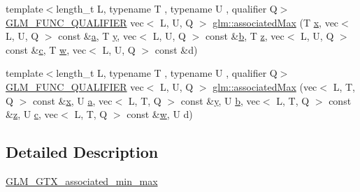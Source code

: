 \begin{DoxyCompactItemize}
\item 
{\footnotesize template$<$length\+\_\+t L, typename T , typename U , qualifier Q$>$ }\\\hyperlink{setup_8hpp_a33fdea6f91c5f834105f7415e2a64407}{G\+L\+M\+\_\+\+F\+U\+N\+C\+\_\+\+Q\+U\+A\+L\+I\+F\+I\+ER} vec$<$ L, U, Q $>$ \hyperlink{group__gtx__associated__min__max_ga11477c2c4b5b0bfd1b72b29df3725a9d}{glm\+::associated\+Max} (T \hyperlink{_s_d_l__opengl_8h_ad0e63d0edcdbd3d79554076bf309fd47}{x}, vec$<$ L, U, Q $>$ const \&\hyperlink{_s_d_l__opengl__glext_8h_a3309789fc188587d666cda5ece79cf82}{a}, T \hyperlink{_s_d_l__opengl_8h_a1675d9d7bb68e1657ff028643b4037e3}{y}, vec$<$ L, U, Q $>$ const \&\hyperlink{_s_d_l__opengl__glext_8h_a0f71581a41fd2264c8944126dabbd010}{b}, T \hyperlink{_s_d_l__opengl__glext_8h_a5e74030ebb3297ce1b37ff716fedd68f}{z}, vec$<$ L, U, Q $>$ const \&\hyperlink{_s_d_l__opengl__glext_8h_a1f2d7f8147412c43ba2303a56f97ee73}{c}, T \hyperlink{_s_d_l__opengl__glext_8h_a6ee8f168a7ab6785a9bb57c6715dad99}{w}, vec$<$ L, U, Q $>$ const \&d)
\item 
{\footnotesize template$<$length\+\_\+t L, typename T , typename U , qualifier Q$>$ }\\\hyperlink{setup_8hpp_a33fdea6f91c5f834105f7415e2a64407}{G\+L\+M\+\_\+\+F\+U\+N\+C\+\_\+\+Q\+U\+A\+L\+I\+F\+I\+ER} vec$<$ L, U, Q $>$ \hyperlink{group__gtx__associated__min__max_gab9c3dd74cac899d2c625b5767ea3b3fb}{glm\+::associated\+Max} (vec$<$ L, T, Q $>$ const \&\hyperlink{_s_d_l__opengl_8h_ad0e63d0edcdbd3d79554076bf309fd47}{x}, U \hyperlink{_s_d_l__opengl__glext_8h_a3309789fc188587d666cda5ece79cf82}{a}, vec$<$ L, T, Q $>$ const \&\hyperlink{_s_d_l__opengl_8h_a1675d9d7bb68e1657ff028643b4037e3}{y}, U \hyperlink{_s_d_l__opengl__glext_8h_a0f71581a41fd2264c8944126dabbd010}{b}, vec$<$ L, T, Q $>$ const \&\hyperlink{_s_d_l__opengl__glext_8h_a5e74030ebb3297ce1b37ff716fedd68f}{z}, U \hyperlink{_s_d_l__opengl__glext_8h_a1f2d7f8147412c43ba2303a56f97ee73}{c}, vec$<$ L, T, Q $>$ const \&\hyperlink{_s_d_l__opengl__glext_8h_a6ee8f168a7ab6785a9bb57c6715dad99}{w}, U d)
\end{DoxyCompactItemize}


\subsection{Detailed Description}
\hyperlink{group__gtx__associated__min__max}{G\+L\+M\+\_\+\+G\+T\+X\+\_\+associated\+\_\+min\+\_\+max} 